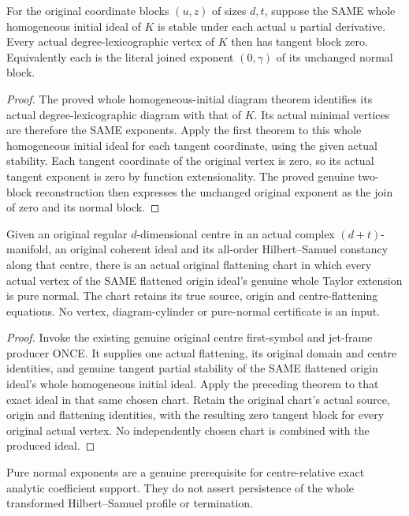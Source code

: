 \begin{theorem}
\label{hir:actual-initial-tangent-stable-pure-normal-vertices}
\leanok
For the original coordinate blocks $(u,z)$ of sizes $d,t$, suppose the
SAME whole homogeneous initial ideal of $K$ is stable under each actual
$u$ partial derivative. Every actual degree-lexicographic vertex of $K$
then has tangent block zero. Equivalently each is the literal joined
exponent $(0,\gamma)$ of its unchanged normal block.
\end{theorem}
\begin{proof}
The proved whole homogeneous-initial diagram theorem identifies its
actual degree-lexicographic diagram with that of $K$. Its actual minimal
vertices are therefore the SAME exponents. Apply the first theorem to
this whole homogeneous initial ideal for each tangent coordinate, using
the given actual stability. Each tangent coordinate of the original
vertex is zero, so its actual tangent exponent is zero by function
extensionality. The proved genuine two-block reconstruction then expresses
the unchanged original exponent as the join of zero and its normal block.
\end{proof}

\begin{theorem}
\label{hir:actual-original-hs-centre-pure-normal-vertices}
\leanok
Given an original regular $d$-dimensional centre in an actual complex
$(d+t)$-manifold, an original coherent ideal and its all-order
Hilbert--Samuel constancy along that centre, there is an actual original
flattening chart in which every actual vertex of the SAME flattened
origin ideal's genuine whole Taylor extension is pure normal. The chart
retains its true source, origin and centre-flattening equations. No
vertex, diagram-cylinder or pure-normal certificate is an input.
\end{theorem}
\begin{proof}
Invoke the existing genuine original centre first-symbol and jet-frame
producer ONCE. It supplies one actual flattening, its original domain and
centre identities, and genuine tangent partial stability of the SAME
flattened origin ideal's whole homogeneous initial ideal. Apply the
preceding theorem to that exact ideal in that same chosen chart. Retain
the original chart's actual source, origin and flattening identities,
with the resulting zero tangent block for every original actual vertex.
No independently chosen chart is combined with the produced ideal.
\end{proof}

Pure normal exponents are a genuine prerequisite for centre-relative exact
analytic coefficient support. They do not assert persistence of the
whole transformed Hilbert--Samuel profile or termination.
